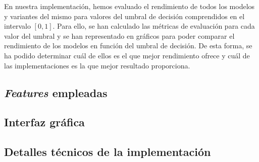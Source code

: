 En nuestra implementación, hemos evaluado el rendimiento de todos los modelos y variantes del
mismo para valores del umbral de decisión comprendidos en el intervalo $[0, 1]$. Para ello, se
han calculado las métricas de evaluación para cada valor del umbral y se han representado en
gráficos para poder comparar el rendimiento de los modelos en función del umbral de decisión. De
esta forma, se ha podido determinar cuál de ellos es el que mejor rendimiento ofrece y cuál de
las implementaciones es la que mejor resultado proporciona.


\subsection{\textit{Features} empleadas}


\subsection{Interfaz gráfica}


\subsection{Detalles técnicos de la implementación}

